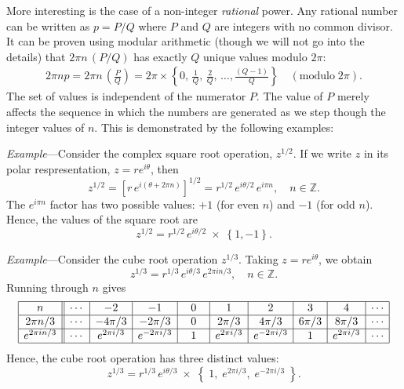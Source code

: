 \documentclass[10pt,a4paper]{article}
\begin{document}
More interesting is the case of a non-integer \textit{rational}
power. Any rational number can be written as $p = P/Q$ where $P$ and
$Q$ are integers with no common divisor.  It can be proven using
modular arithmetic (though we will not go into the details) that $2\pi
n\, (P/Q)$ has exactly $Q$ unique values modulo $2\pi$:
\begin{align}
  2 \pi n p = 2\pi n\, \left(\frac{P}{Q}\right) = 2\pi \times \left\{0,\, \frac{1}{Q},\, \frac{2}{Q},\, \dots, \frac{(Q-1)}{Q} \right\} \quad(\mathrm{modulo} \; 2\pi).
\end{align}
The set of values is independent of the numerator $P$.  The value of
$P$ merely affects the sequence in which the numbers are generated as
we step though the integer values of $n$. This is demonstrated by the
following examples:

\begin{framed} \noindent
\textit{Example}---Consider the complex square root operation,
$z^{1/2}$. If we write $z$ in its polar respresentation, $z = r
e^{i\theta}$, then
\begin{equation}
  z^{1/2} = \left[r \, e^{i(\theta + 2 \pi n)} \right]^{1/2} = r^{1/2} \, e^{i\theta/2} \, e^{i \pi n}, \quad n \in \mathbb{Z}.
\end{equation}
The $e^{i\pi n}$ factor has two possible values: $+1$ (for even $n$) and $-1$ (for odd $n$). Hence, the values of the square root are
\begin{equation}
  z^{1/2} = r^{1/2} \, e^{i\theta/2} \;\times\; \left\{1, -1\right\}.
\end{equation}
\end{framed}

\begin{framed} \noindent
  \textit{Example}---Consider the cube root operation $z^{1/3}$.
  Taking $z = r e^{i\theta}$, we obtain
\begin{equation}
z^{1/3} = r^{1/3} \, e^{i\theta/3} \, e^{2\pi i n/3}, \quad n \in \mathbb{Z}.
\end{equation}
Running through $n$ gives
\begin{align*}
  \begin{array}{|c||c|c|c|c|c|c|c|c|c|} \hline n &\cdots & -2 & -1 & 0 & 1 & 2 & 3 & 4 & \cdots \\ \hline 2\pi n / 3 &\cdots & -4\pi/3 & -2\pi/3 & 0 & 2\pi/3 & 4\pi/3 & 6\pi/3 & 8\pi/3 & \cdots \\ \hline e^{2\pi i n/3} &\cdots & e^{2\pi i /3} & e^{-2\pi i /3} & \;\,\;1\;\,\; & e^{2\pi i /3} & e^{-2\pi i /3} & \;\,\;1\;\,\; & e^{2\pi i /3} & \cdots \\ \hline \end{array}
\end{align*}
Hence, the cube root operation has three distinct values:
\begin{equation}
  z^{1/3} = r^{1/3} \, e^{i\theta/3} \;\times\; \left\{\;
  1, \;e^{2\pi i /3},\; e^{-2\pi i /3}\; \right\}.
\end{equation}
\end{framed}
\end{document}
